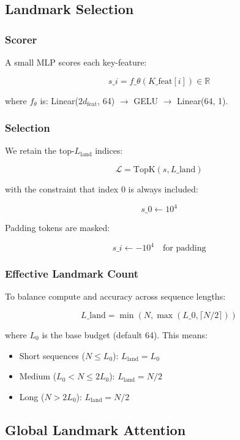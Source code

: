 \subsection{Landmark Selection}

\subsubsection{Scorer}

A small MLP scores each key-feature:

\[
s\_i = f\_\theta(K\_\text{feat}[i]) \in \mathbb{R}
\tag{4.2}
\]

where $f_\theta$ is: Linear($2 d_\text{feat}$, 64) $\to$ GELU $\to$ Linear(64, 1).

\subsubsection{Selection}

We retain the top-$L_\text{land}$ indices:

\[
\mathcal{L} = \text{TopK}(s, L\_\text{land})
\tag{4.3}
\]

with the constraint that index 0 is always included:

\[
s\_0 \leftarrow 10^4
\tag{4.4}
\]

Padding tokens are masked:

\[
s\_i \leftarrow -10^4 \quad \text{for padding}
\tag{4.5}
\]

\subsubsection{Effective Landmark Count}

To balance compute and accuracy across sequence lengths:

\[
L\_\text{land} = \min(N, \max(L\_0, \lceil N/2 \rceil))
\tag{4.6}
\]

where $L_0$ is the base budget (default 64). This means:
\begin{itemize}
\item Short sequences ($N \leq L_0$): $L_\text{land} = L_0$
\item Medium ($L_0 < N \leq 2 L_0$): $L_\text{land} = N/2$
\item Long ($N > 2 L_0$): $L_\text{land} = N/2$

\end{itemize}
\subsection{Global Landmark Attention}

